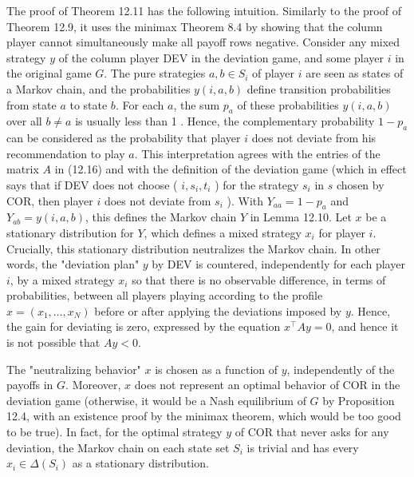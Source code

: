 \documentclass[12pt]{article}
\begin{document}
The proof of Theorem 12.11 has the following intuition. Similarly to the proof of Theorem 12.9, it uses the minimax Theorem 8.4 by showing that the column player cannot simultaneously make all payoff rows negative. Consider any mixed strategy $y$ of the column player DEV in the deviation game, and some player $i$ in\\
the original game $G$. The pure strategies $a, b \in S_{i}$ of player $i$ are seen as states of a Markov chain, and the probabilities $y(i, a, b)$ define transition probabilities from state $a$ to state $b$. For each $a$, the sum $p_{a}$ of these probabilities $y(i, a, b)$ over all $b \neq a$ is usually less than 1 . Hence, the complementary probability $1-p_{a}$ can be considered as the probability that player $i$ does not deviate from his recommendation to play $a$. This interpretation agrees with the entries of the matrix $A$ in (12.16) and with the definition of the deviation game (which in effect says that if DEV does not choose ( $i, s_{i}, t_{i}$ ) for the strategy $s_{i}$ in $s$ chosen by COR, then player $i$ does not deviate from $s_{i}$ ). With $Y_{a a}=1-p_{a}$ and $Y_{a b}=y(i, a, b)$, this defines the Markov chain $Y$ in Lemma 12.10. Let $x$ be a stationary distribution for $Y$, which defines a mixed strategy $x_{i}$ for player $i$. Crucially, this stationary distribution neutralizes the Markov chain. In other words, the "deviation plan" $y$ by DEV is countered, independently for each player $i$, by a mixed strategy $x_{i}$ so that there is no observable difference, in terms of probabilities, between all players playing according to the profile $x=\left(x_{1}, \ldots, x_{N}\right)$ before or after applying the deviations imposed by $y$. Hence, the gain for deviating is zero, expressed by the equation $x^{\top} A y=0$, and hence it is not possible that $A y<0$.

The "neutralizing behavior" $x$ is chosen as a function of $y$, independently of the payoffs in $G$. Moreover, $x$ does not represent an optimal behavior of COR in the deviation game (otherwise, it would be a Nash equilibrium of $G$ by Proposition 12.4, with an existence proof by the minimax theorem, which would be too good to be true). In fact, for the optimal strategy $y$ of COR that never asks for any deviation, the Markov chain on each state set $S_{i}$ is trivial and has every $x_{i} \in \Delta\left(S_{i}\right)$ as a stationary distribution.
\end{document}
